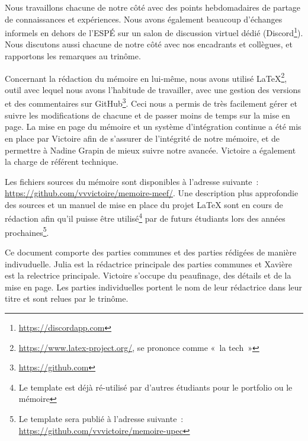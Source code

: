 Nous travaillons chacune de notre côté avec des points hebdomadaires de partage de connaissances et expériences. Nous avons également beaucoup d’échanges informels en dehors de l’ESPÉ sur un salon de discussion virtuel dédié (Discord\footnote{\url{https://discordapp.com}}). Nous discutons aussi chacune de notre côté avec nos encadrants et collègues, et rapportons les remarques au trinôme.

Concernant la rédaction du mémoire en lui-même, nous avons utilisé \LaTeX\footnote{\url{https://www.latex-project.org/}, se prononce comme « la tech »},
outil avec lequel nous avons l’habitude de travailler, avec une gestion des versions et des commentaires sur GitHub\footnote{\url{https://github.com}}. Ceci nous a permis de très facilement gérer et suivre les modifications de chacune et de passer moins de temps sur la mise en page. La mise en page du mémoire et un système d'intégration continue a été mis en place par Victoire afin de s'assurer de l'intégrité de notre mémoire, et de permettre à Nadine Grapin de mieux suivre notre avancée. Victoire a également la charge de référent technique.

Les fichiers sources du mémoire sont disponibles à l'adresse suivante : \url{https://github.com/vvvictoire/memoire-meef/}. Une description plus approfondie des sources et un manuel de mise en place du projet \LaTeX{} sont en cours de rédaction afin qu'il puisse être utilisé\footnote{Le template est déjà ré-utilisé par d'autres étudiants pour le portfolio ou le mémoire} par de futurs étudiants lors des années prochaines\footnote{Le template sera publié à l'adresse
suivante : \url{https://github.com/vvvictoire/memoire-upec}}.

Ce document comporte des parties communes et des parties rédigées de manière indivuduelle. Julia est la rédactrice principale des parties communes et Xavière est la relectrice principale.
Victoire s'occupe du peaufinage, des détails et de la mise en page. Les parties individuelles portent le nom de leur rédactrice dans leur titre et sont relues par le trinôme.
